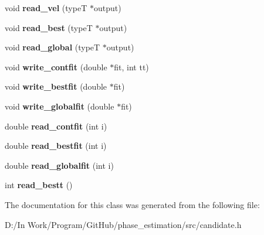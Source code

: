 \begin{DoxyCompactItemize}
\item 
\hypertarget{classCandidate_a49f8e0f5b9a3ad4df2993ef2415552ce}{}void {\bfseries read\+\_\+vel} (type\+T $\ast$output)\label{classCandidate_a49f8e0f5b9a3ad4df2993ef2415552ce}

\item 
\hypertarget{classCandidate_adc8885a1bc7990d5060fb41fb0b84307}{}void {\bfseries read\+\_\+best} (type\+T $\ast$output)\label{classCandidate_adc8885a1bc7990d5060fb41fb0b84307}

\item 
\hypertarget{classCandidate_ad8df30af1e76d0cbcc6563107877756e}{}void {\bfseries read\+\_\+global} (type\+T $\ast$output)\label{classCandidate_ad8df30af1e76d0cbcc6563107877756e}

\item 
\hypertarget{classCandidate_afe7099f234d4aab5f01bce84601dc19d}{}void {\bfseries write\+\_\+contfit} (double $\ast$fit, int tt)\label{classCandidate_afe7099f234d4aab5f01bce84601dc19d}

\item 
\hypertarget{classCandidate_a5d186a93dad0f8b333c8dadc86bdb1e2}{}void {\bfseries write\+\_\+bestfit} (double $\ast$fit)\label{classCandidate_a5d186a93dad0f8b333c8dadc86bdb1e2}

\item 
\hypertarget{classCandidate_a4eefbfbed65c2023619863de995333b6}{}void {\bfseries write\+\_\+globalfit} (double $\ast$fit)\label{classCandidate_a4eefbfbed65c2023619863de995333b6}

\item 
\hypertarget{classCandidate_a6baad7d2a8970192a5b4f1e148cfd907}{}double {\bfseries read\+\_\+contfit} (int i)\label{classCandidate_a6baad7d2a8970192a5b4f1e148cfd907}

\item 
\hypertarget{classCandidate_a87732e684af19e231b40f7556e3519a1}{}double {\bfseries read\+\_\+bestfit} (int i)\label{classCandidate_a87732e684af19e231b40f7556e3519a1}

\item 
\hypertarget{classCandidate_aa0c5b47e7e4f578b3661e641a9ddf9dd}{}double {\bfseries read\+\_\+globalfit} (int i)\label{classCandidate_aa0c5b47e7e4f578b3661e641a9ddf9dd}

\item 
\hypertarget{classCandidate_ad83fabe7087e40e18bb8d4d511abf67f}{}int {\bfseries read\+\_\+bestt} ()\label{classCandidate_ad83fabe7087e40e18bb8d4d511abf67f}

\end{DoxyCompactItemize}


The documentation for this class was generated from the following file\+:\begin{DoxyCompactItemize}
\item 
D\+:/\+In Work/\+Program/\+Git\+Hub/phase\+\_\+estimation/src/candidate.\+h\end{DoxyCompactItemize}

